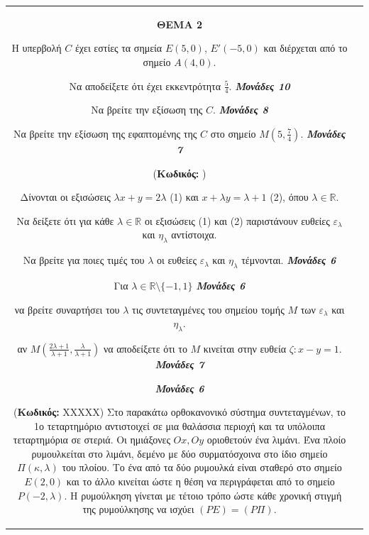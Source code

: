 \documentclass[11pt,a4paper,twoside]{book}
\newcommand{\OnPar}[1]{{\notoserif\bfseries\fontsize{18}{22}\selectfont #1}}
\newcounter{askhsh}[chapter]
\renewcommand{\theaskhsh}{
	\bf{\titlefont{\Large{\thechapter}}.\arabic{askhsh}}
}
\newcommand{\Askhsh}[2]{\refstepcounter{askhsh}{\vspace{4mm}\titlefont{{\large Άσκηση}\theaskhsh} - \textcolor{maincolor}{ΘEMA #2}} ({\small{\textbf{Κωδικός:} #1}})}{}
\newcommand{\monades}[1]{
\hspace*{\fill}
\textbf{\textit{\textcolor{maincolor}{Μονάδες #1}}}}
\begin{document}
\begin{tabular}{cc}
\OnPar{ΘΕΜΑ 2}

Η υπερβολή $C$ έχει εστίες τα σημεία $E(5,0)$, $E'(-5,0)$ και διέρχεται από το σημείο $A(4,0)$.

\begin{alist}    \item Να αποδείξετε ότι έχει εκκεντρότητα $\frac{5}{4}$. \monades{10}
    \item Να βρείτε την εξίσωση της $C$. \monades{8}
    \item Να βρείτε την εξίσωση της εφαπτομένης της $C$ στο σημείο $M\left(5, \frac{7}{4}\right)$. \monades{7}\end{alist}

\vspace{4mm}

\Askhsh{}{4}

Δίνονται οι εξισώσεις $\lambda x + y = 2\lambda$ (1) και $x + \lambda y = \lambda +1$ (2), όπου $\lambda \in \mathbb{R}$.

\begin{alist}    \item Να δείξετε ότι για κάθε $\lambda \in \mathbb{R}$ οι εξισώσεις (1) και (2) παριστάνουν ευθείες $\varepsilon_\lambda$ και $\eta_\lambda$ αντίστοιχα.
    \item Να βρείτε για ποιες τιμές του $\lambda$ οι ευθείες $\varepsilon_\lambda$ και $\eta_\lambda$ τέμνονται.  \monades{6}
    \item Για $\lambda \in \mathbb{R} \setminus \{-1,1\}$  \monades{6}
    \begin{rlist}
        \item να βρείτε συναρτήσει του $\lambda$ τις συντεταγμένες του σημείου τομής $M$ των $\varepsilon_\lambda$ και $\eta_\lambda$.

        \item αν $M \left( \frac{2\lambda+1}{\lambda+1}, \frac{\lambda}{\lambda+1} \right)$ να αποδείξετε ότι το $M$ κινείται στην ευθεία $\zeta: x-y=1$.  \monades{7}
 \monades{6}
    \end{rlist}\end{alist}

\vspace{4mm}

\Askhsh{XXXXX}{4}
Στο παρακάτω ορθοκανονικό σύστημα συντεταγμένων, το 1ο τεταρτημόριο αντιστοιχεί σε μια θαλάσσια περιοχή και τα υπόλοιπα τεταρτημόρια σε στεριά. Οι ημιάξονες $Ox, Oy$ οριοθετούν ένα λιμάνι. Ένα πλοίο ρυμουλκείται στο λιμάνι, δεμένο με δύο συρματόσχοινα στο ίδιο σημείο $\Pi(\kappa,\lambda)$ του πλοίου. Το ένα από τα δύο ρυμουλκά είναι σταθερό στο σημείο $E(2,0)$ και το άλλο κινείται ώστε η θέση να περιγράφεται από το σημείο $P(-2, \lambda)$. Η ρυμούλκηση γίνεται με τέτοιο τρόπο ώστε κάθε χρονική στιγμή της ρυμούλκησης να ισχύει $(PE) = (P\Pi)$.


\end{tabular}
\end{document}
